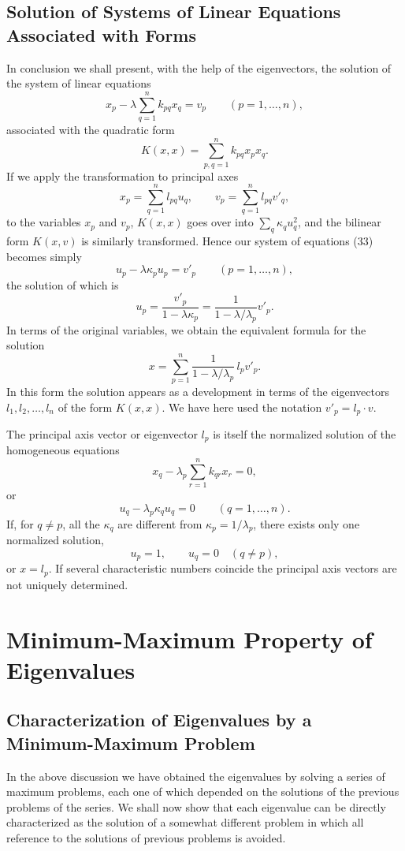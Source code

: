 \subsection{Solution of Systems of Linear Equations Associated with Forms}
In conclusion we shall present, with the help of the eigenvectors, the solution of the system of linear equations
\begin{equation}x_p-\lambda\sum_{q=1}^n k_{pq}x_q=v_p\qquad(p=1,\ldots,n), \tag{33}\end{equation}
associated with the quadratic form
\[K(x,x)=\sum_{p,q=1}^n k_{pq}x_px_q.\]
If we apply the transformation to principal axes
\[x_p=\sum_{q=1}^n l_{pq}u_q,\qquad v_p=\sum_{q=1}^n l_{pq}v'_q,\]
to the variables $x_p$ and $v_p$, $K(x,x)$ goes over into $\sum_q\kappa_q u_q^2$, and the bilinear form $K(x,v)$ is similarly transformed. Hence our system of equations (33) becomes simply
\begin{equation}u_p-\lambda\kappa_pu_p=v'_p\qquad(p=1,\ldots,n), \tag{34}\end{equation}
the solution of which is
\begin{equation}u_p=\frac{v'_p}{1-\lambda\kappa_p}=\frac{1}{1-\lambda/\lambda_p}v'_p. \tag{35}\end{equation}
In terms of the original variables, we obtain the equivalent formula for the solution
\begin{equation}x=\sum_{p=1}^n\frac{1}{1-\lambda/\lambda_p}\,l_pv'_p. \tag{36}\end{equation}
In this form the solution appears as a development in terms of the eigenvectors $l_1,l_2,\ldots,l_n$ of the form $K(x,x)$. We have here used the notation $v'_p=l_p\cdot v$.

The principal axis vector or eigenvector $l_p$ is itself the normalized solution of the homogeneous equations
\[x_q-\lambda_p\sum_{r=1}^n k_{qr}x_r=0,\]
or
\[u_q-\lambda_p\kappa_qu_q=0\qquad(q=1,\ldots,n).\]
If, for $q\ne p$, all the $\kappa_q$ are different from $\kappa_p=1/\lambda_p$, there exists only one normalized solution,
\[u_p=1,\qquad u_q=0\quad(q\ne p),\]
or $x=l_p$. If several characteristic numbers coincide the principal axis vectors are not uniquely determined.

\section{Minimum-Maximum Property of Eigenvalues}
\subsection{Characterization of Eigenvalues by a Minimum-Maximum Problem}
In the above discussion we have obtained the eigenvalues by solving a series of maximum problems, each one of which depended on the solutions of the previous problems of the series. We shall now show that each eigenvalue can be directly characterized as the solution of a somewhat different problem in which all reference to the solutions of previous problems is avoided.


